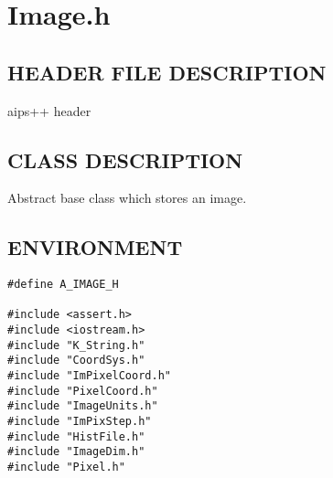 \clearpage
\section{Image.h}

\subsection*{HEADER FILE DESCRIPTION}
   aips++ header

\subsection*{CLASS DESCRIPTION}
   Abstract base class which stores an image.

\subsection*{ENVIRONMENT}
\begin{verbatim}
#define A_IMAGE_H

#include <assert.h>
#include <iostream.h>
#include "K_String.h"
#include "CoordSys.h"
#include "ImPixelCoord.h"
#include "PixelCoord.h"
#include "ImageUnits.h"
#include "ImPixStep.h"
#include "HistFile.h"
#include "ImageDim.h"
#include "Pixel.h"

\end{verbatim}
